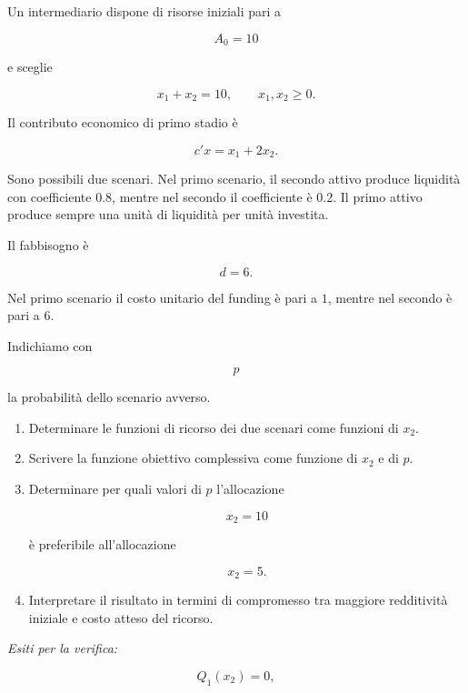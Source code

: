 \begin{exercise}

\label{ex:cap14-proposto-probabilita-avversa}

Un intermediario dispone di risorse iniziali pari a

\[
A_0=10
\]

\noindent e sceglie

\[
x_1+x_2=10,
\qquad
x_1,x_2\geq0.
\]

Il contributo economico di primo stadio \`e

\[
c'x
=
x_1+2x_2.
\]

Sono possibili due scenari. Nel primo scenario, il secondo attivo produce
liquidit\`a con coefficiente $0.8$, mentre nel secondo il coefficiente \`e
$0.2$. Il primo attivo produce sempre una unit\`a di liquidit\`a per unit\`a
investita.

Il fabbisogno \`e

\[
d=6.
\]

Nel primo scenario il costo unitario del funding \`e pari a $1$, mentre nel
secondo \`e pari a $6$.

Indichiamo con

\[
p
\]

\noindent la probabilit\`a dello scenario avverso.

\begin{enumerate}

\item Determinare le funzioni di ricorso dei due scenari come funzioni di
$x_2$.

\item Scrivere la funzione obiettivo complessiva come funzione di $x_2$ e di
$p$.

\item Determinare per quali valori di $p$ l'allocazione

\[
x_2=10
\]

\`e preferibile all'allocazione

\[
x_2=5.
\]

\item Interpretare il risultato in termini di compromesso tra maggiore
redditivit\`a iniziale e costo atteso del ricorso.

\end{enumerate}

\medskip

\noindent
\textit{Esiti per la verifica:}

\[
Q_1(x_2)=0,
\]


\end{exercise}
